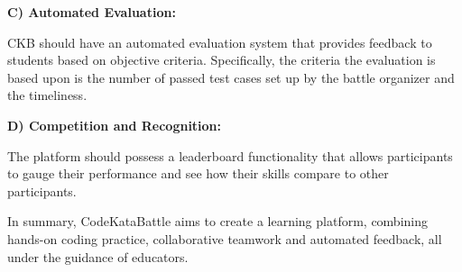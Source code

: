 \documentclass{article}
\begin{document}
\textbf{C) Automated Evaluation:}

CKB should have an automated evaluation system that provides feedback to students based on
 objective criteria. Specifically, the criteria the evaluation is based upon is the number of passed test cases 
 set up by the battle organizer and the timeliness. 

 \textbf{D) Competition and Recognition:}

The platform should possess a leaderboard functionality that allows participants to 
gauge their performance and see how their skills compare to other participants.

In summary, CodeKataBattle aims to create a learning platform, combining 
hands-on coding practice, collaborative teamwork and automated feedback, all under the 
guidance of educators. 
\end{document}
